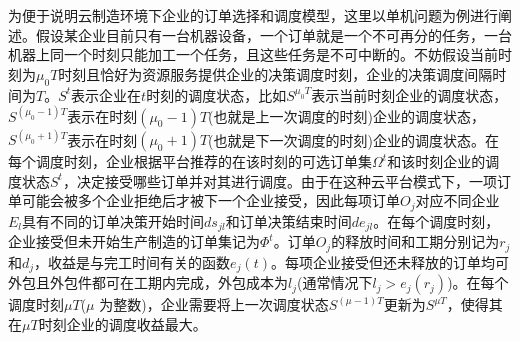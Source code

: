 \documentclass[UTF8]{ctexart}
\begin{document}
为便于说明云制造环境下企业的订单选择和调度模型，这里以单机问题为例进行阐述。假设某企业目前只有一台机器设备，一个订单就是一个不可再分的任务，一台机器上同一个时刻只能加工一个任务，且这些任务是不可中断的。不妨假设当前时刻为$\mu_0 T$时刻且恰好为资源服务提供企业的决策调度时刻，企业的决策调度间隔时间为$T$。$S^t$表示企业在$t$时刻的调度状态，比如$S^{\mu_0 T}$表示当前时刻企业的调度状态，$S^{(\mu_0 - 1)T}$表示在时刻$(\mu_0 - 1)T$(也就是上一次调度的时刻)企业的调度状态，$S^{(\mu_0 + 1)T}$表示在时刻$(\mu_0 + 1)T$(也就是下一次调度的时刻)企业的调度状态。在每个调度时刻，企业根据平台推荐的在该时刻的可选订单集$\Omega^t$和该时刻企业的调度状态$S^t$，决定接受哪些订单并对其进行调度。由于在这种云平台模式下，一项订单可能会被多个企业拒绝后才被下一个企业接受，因此每项订单$O_j$对应不同企业$E_l$具有不同的订单决策开始时间$ds_{jl}$和订单决策结束时间$de_{jl}$。在每个调度时刻，企业接受但未开始生产制造的订单集记为$\Phi^t$。订单$O_j$的释放时间和工期分别记为$r_j$和$d_j$，收益是与完工时间有关的函数$e_j(t)$。每项企业接受但还未释放的订单均可外包且外包件都可在工期内完成，外包成本为$l_j$(通常情况下$l_j > e_j(r_j)$)。在每个调度时刻$\mu T$($\mu$ 为整数)，企业需要将上一次调度状态$S^{(\mu - 1)T}$更新为$S^{\mu T}$，使得其在$\mu T$时刻企业的调度收益最大。
\end{document}
